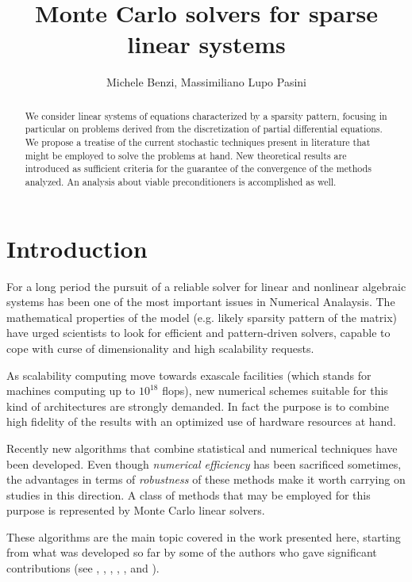 \documentclass[a4paper,10pt]{article}
\title{Monte Carlo solvers for sparse linear systems}
\author{Michele Benzi, Massimiliano Lupo Pasini}
\date{}
\begin{document}
\maketitle

\begin{abstract}
We consider linear systems of equations characterized by a sparsity pattern, 
focusing in particular on problems derived from the discretization of partial 
differential equations. We propose a treatise of the current stochastic 
techniques present in literature that might be employed to solve the problems at 
hand. New theoretical results are introduced as sufficient criteria for the 
guarantee of the convergence of the methods analyzed. An analysis about viable 
preconditioners is accomplished as well. 
\end{abstract}

\section{Introduction}
For a long period the  
pursuit of a reliable solver for linear and nonlinear algebraic systems has 
been one of the most important issues in Numerical Analaysis. The 
mathematical properties of the model (e.g. likely sparsity pattern of the 
matrix) have urged scientists to look for efficient and pattern-driven 
solvers, capable to cope with curse of dimensionality and high scalability 
requests.

As scalability computing move towards exascale facilities (which stands for 
machines computing up to $10^{18}$ flops), new numerical schemes suitable for 
this 
kind of architectures are strongly demanded. In fact the purpose is to combine 
high 
fidelity of the results with an optimized use of hardware resources at hand.

Recently new algorithms that combine statistical and numerical techniques have 
been developed. Even though \textit{numerical efficiency} has been sacrificed 
sometimes, the advantages in terms of \textit{robustness} of these methods make 
it worth carrying on studies in this direction.
A class of methods that may be employed for this purpose is represented by 
Monte Carlo linear solvers.

These algorithms are the main topic covered in the work presented here, 
starting from what was developed so far by some of 
the authors who gave significant contributions (see \cite{Hal1962}, 
\cite{Hal1994}, 
\cite{DA1998}, \cite{DVA2001}, \cite{AADBTW2005},\cite{ESW2013} and 
\cite{EMSH2014}). \newline
\end{document}

